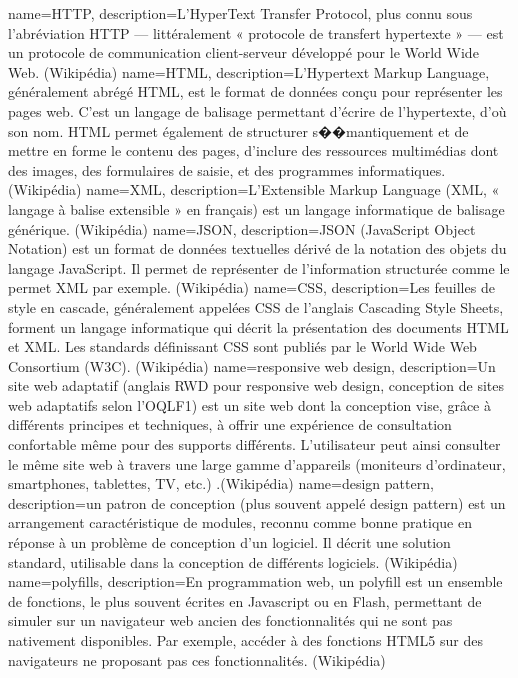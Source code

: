 {
  name=HTTP,
  description={L'HyperText Transfer Protocol, plus connu sous l'abréviation HTTP — littéralement « protocole de transfert hypertexte » — est un protocole de communication client-serveur développé pour le World Wide Web. (Wikipédia)}
}
{
  name=HTML,
  description={L’Hypertext Markup Language, généralement abrégé HTML, est le format de données conçu pour représenter les pages web. C’est un langage de balisage permettant d’écrire de l’hypertexte, d’où son nom. HTML permet également de structurer s��mantiquement et de mettre en forme le contenu des pages, d’inclure des ressources multimédias dont des images, des formulaires de saisie, et des programmes informatiques. (Wikipédia)}
}
{
  name=XML,
  description={L'Extensible Markup Language (XML, « langage à balise extensible » en français) est un langage informatique de balisage générique. (Wikipédia)}
}
{
  name=JSON,
  description={JSON (JavaScript Object Notation) est un format de données textuelles dérivé de la notation des objets du langage JavaScript. Il permet de représenter de l’information structurée comme le permet XML par exemple. (Wikipédia)}
}
{
  name=CSS,
  description={Les feuilles de style en cascade, généralement appelées CSS de l'anglais Cascading Style Sheets, forment un langage informatique qui décrit la présentation des documents HTML et XML. Les standards définissant CSS sont publiés par le World Wide Web Consortium (W3C). (Wikipédia)}
}
{
  name=responsive web design,
  description={Un site web adaptatif (anglais RWD pour responsive web design, conception de sites web adaptatifs selon l'OQLF1) est un site web dont la conception vise, grâce à différents principes et techniques, à offrir une expérience de consultation confortable même pour des supports différents. L'utilisateur peut ainsi consulter le même site web à travers une large gamme d'appareils (moniteurs d'ordinateur, smartphones, tablettes, TV, etc.) .(Wikipédia)}
}
{
  name=design pattern,
  description={un patron de conception (plus souvent appelé design pattern) est un arrangement caractéristique de modules, reconnu comme bonne pratique en réponse à un problème de conception d'un logiciel. Il décrit une solution standard, utilisable dans la conception de différents logiciels. (Wikipédia)}
}
{
  name=polyfills,
  description={En programmation web, un polyfill est un ensemble de fonctions, le plus souvent écrites en Javascript ou en Flash, permettant de simuler sur un navigateur web ancien des fonctionnalités qui ne sont pas nativement disponibles. Par exemple, accéder à des fonctions HTML5 sur des navigateurs ne proposant pas ces fonctionnalités. (Wikipédia)}
}
